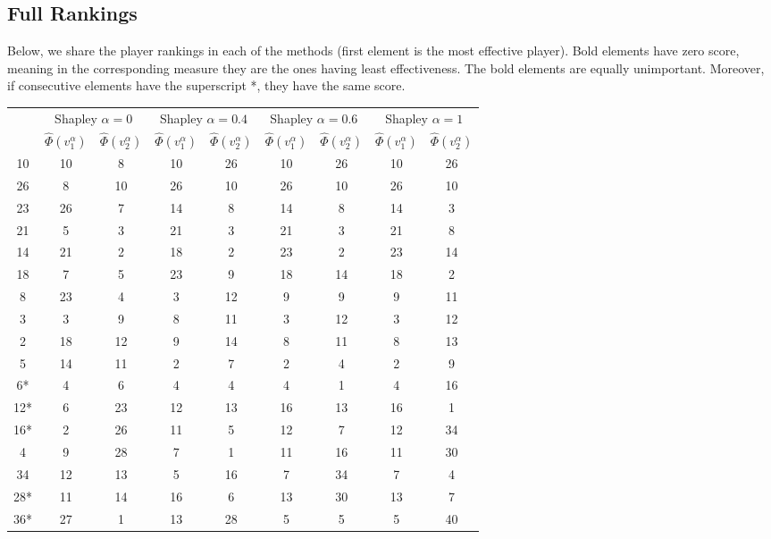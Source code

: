 \documentclass[10p]{article}
\theoremstyle{definition}
\theoremstyle{definition}
\begin{document}
\begin{appendices}
\section{Full Rankings} \label{AppendixRankings}
Below, we share the player rankings in each of the methods (first element is the most effective player). Bold elements have zero score, meaning in the corresponding measure they are the ones having least effectiveness. The bold elements are equally unimportant. Moreover, if consecutive elements have the superscript *, they have the same score.\\
\begin{table}[!ht]\centering
\begin{tabular}{*{9}{c}}
\toprule
\multirow{2}[3]{*}{\cite{mancuso2014not}} &  \multicolumn{2}{c}{Shapley $\alpha = 0$} & \multicolumn{2}{c}{Shapley $\alpha = 0.4$} & \multicolumn{2}{c}{Shapley $\alpha = 0.6$}& \multicolumn{2}{c}{Shapley $\alpha = 1$}\\
\cmidrule(lr){2-3} \cmidrule(lr){4-5} \cmidrule(lr){6-7} \cmidrule(lr){8-9}
 & $\hat{\Phi}(v_1^\alpha)$ & $\hat{\Phi}(v_2^\alpha)$ & $\hat{\Phi}(v_1^\alpha)$ & $\hat{\Phi}(v_2^\alpha)$  & $\hat{\Phi}(v_1^\alpha)$ & $\hat{\Phi}(v_2^\alpha)$ & $\hat{\Phi}(v_1^\alpha)$ & $\hat{\Phi}(v_2^\alpha)$\\
\midrule
10 & 10 & 8 & 10&26 & 10& 26&10 &  26\\ 
26 & 8 & 10 & 26& 10&26 &10 &26 &10\\ 
23 &26 & 7 &14 &8 &14 &8 &14 &3\\ 
21 & 5& 3 & 21&3 & 21&3 &21 &8\\ 
14 & 21& 2 &18 & 2&23 & 2&23 &14\\ 
18 &7 & 5 & 23& 9 & 18&14 &18 &2\\ 
8 & 23& 4 & 3&12 & 9&9 &9 &11\\ 
3 &3 & 9 & 8& 11&3 &12 &3 &12\\ 
2 &18 & 12 &9 &14 &8 &11 &8 &13\\ 
5 &14 & 11 &2 &7 & 2 &4 &2 &9\\ 
6* &4 &  6&4 & 4& 4&1 & 4&16\\ 
12* &6 & 23 &12 &13 &16 & 13&16 &1\\ 
16* &2 & 26 &11 &5 & 12&7 &12 &34\\ 
4 &9 &  28&7 & 1& 11& 16& 11&30\\ 
34 &12 & 13 &5 &16 & 7&34 &7 &4\\ 
28* &11 & 14 & 16& 6&13 & 30&13 &7\\ 
36* &27 & 1 & 13&28 &5 &5 &5 &40\\ 

\end{tabular}
\end{table}
\end{appendices}
\end{document}
